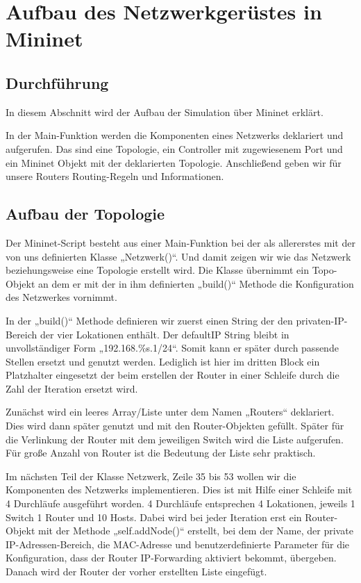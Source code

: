 \documentclass[fontsize=12pt,paper=a4,open=any,parskip=half,
  twoside=false,toc=listof,toc=bibliography,fleqn,leqno,
  captions=nooneline,captions=tableabove,british]{scrbook}
\begin{document}
\section{Aufbau des Netzwerkgerüstes in Mininet}
\subsection{Durchführung}
In diesem Abschnitt wird der Aufbau der Simulation über Mininet erklärt.
 
In der Main-Funktion werden die Komponenten eines Netzwerks deklariert und aufgerufen. Das sind eine Topologie, ein Controller mit zugewiesenem Port und ein Mininet Objekt mit der deklarierten Topologie. Anschließend geben wir für unsere Routers Routing-Regeln und Informationen.

\subsection{Aufbau der Topologie}
Der Mininet-Script besteht aus einer Main-Funktion bei der als allererstes mit der von uns definierten Klasse „Netzwerk()“. Und damit zeigen wir wie das Netzwerk beziehungsweise eine Topologie erstellt wird. Die Klasse übernimmt ein Topo-Objekt an dem er mit der in ihm definierten „build()“ Methode die Konfiguration des Netzwerkes vornimmt. 
 
In der „build()“ Methode definieren wir zuerst einen String der den privaten-IP-Bereich der vier Lokationen enthält. Der defaultIP String bleibt in unvollständiger Form „192.168.\%s.1/24“. Somit kann er später durch passende Stellen ersetzt und genutzt werden. Lediglich ist hier im dritten Block ein Platzhalter eingesetzt der beim erstellen der Router in einer Schleife durch die Zahl der Iteration ersetzt wird.
 
Zunächst wird ein leeres Array/Liste unter dem Namen „Routers“ deklariert. Dies wird dann später genutzt und mit den Router-Objekten gefüllt. Später für die Verlinkung der Router mit dem jeweiligen Switch wird die Liste aufgerufen. Für große Anzahl von Router ist die Bedeutung der Liste sehr praktisch.
 
Im nächsten Teil der Klasse Netzwerk, Zeile 35 bis 53 wollen wir die Komponenten des Netzwerks implementieren. Dies ist mit Hilfe einer Schleife mit 4 Durchläufe ausgeführt worden. 4 Durchläufe entsprechen 4 Lokationen, jeweils 1 Switch 1 Router und 10 Hosts.
Dabei wird bei jeder Iteration erst ein Router-Objekt mit der Methode „self.addNode()“ erstellt, bei dem der Name, der private IP-Adressen-Bereich, die MAC-Adresse und benutzerdefinierte Parameter für die Konfiguration, dass der Router IP-Forwarding aktiviert bekommt, übergeben. Danach wird der Router der vorher erstellten Liste eingefügt.
 
\end{document}
